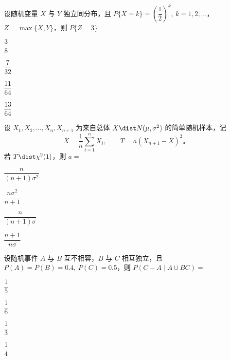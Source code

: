 \begin{question}[index=8]
设随机变量 $X$ 与 $Y$ 独立同分布，且 $P\{X=k\}=\left(\dfrac12\right)^k,\ k=1,2,\dots$，$Z=\max\{X,Y\}$，则 $P\{Z=3\}=$
\begin{choices}[columns=4]
\item $\dfrac38$
\item $\dfrac7{32}$
\item $\dfrac{11}{64}$
\item $\dfrac{13}{64}$
\end{choices}
\end{question}
\QuestionBreak

\begin{question}[index=9]
设 $X_1,X_2,\dots,X_n,X_{n+1}$ 为来自总体 $X\dist N(\mu,\sigma^2)$ 的简单随机样本，记
\[
\overline X=\frac1n\sum_{i=1}^nX_i,\qquad T=a(X_{n+1}-\overline X)^2\text{。}
\]
若 $T\dist\chi^2(1)$，则 $a=$
\begin{choices}[columns=4]
\item $\dfrac{n}{(n+1)\sigma^2}$
\item $\dfrac{n\sigma^2}{n+1}$
\item $\dfrac{n}{(n+1)\sigma}$
\item $\dfrac{n+1}{n\sigma}$
\end{choices}
\end{question}
\QuestionBreak

\begin{question}[index=10]
设随机事件 $A$ 与 $B$ 互不相容，$B$ 与 $C$ 相互独立，且 $P(A)=P(B)=0.4,\ P(C)=0.5$，则 $P(C-A\mid A\cup BC)=$
\begin{choices}[columns=4]
\item $\dfrac15$
\item $\dfrac16$
\item $\dfrac13$
\item $\dfrac14$
\end{choices}
\end{question}
